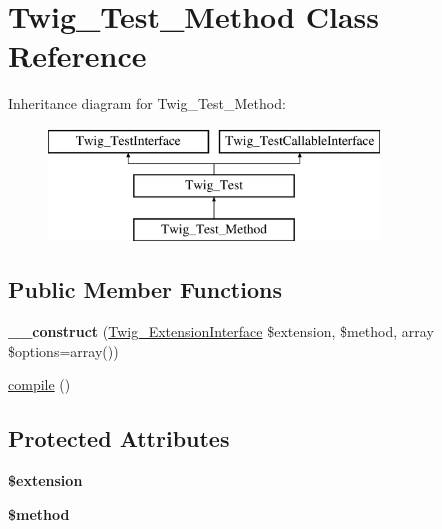 \hypertarget{class_twig___test___method}{}\section{Twig\+\_\+\+Test\+\_\+\+Method Class Reference}
\label{class_twig___test___method}
Inheritance diagram for Twig\+\_\+\+Test\+\_\+\+Method\+:\begin{figure}[H]
\begin{center}
\leavevmode
\includegraphics[height=3.000000cm]{class_twig___test___method}
\end{center}
\end{figure}
\subsection*{Public Member Functions}
\begin{DoxyCompactItemize}
\item 
\hypertarget{class_twig___test___method_a7d07ee619832b0ff21eaf3c7c0159c3f}{}{\bfseries \+\_\+\+\_\+construct} (\hyperlink{interface_twig___extension_interface}{Twig\+\_\+\+Extension\+Interface} \$extension, \$method, array \$options=array())\label{class_twig___test___method_a7d07ee619832b0ff21eaf3c7c0159c3f}

\item 
\hyperlink{class_twig___test___method_a3815e7c2e73f00c2ebffcf5b90eef3b1}{compile} ()
\end{DoxyCompactItemize}
\subsection*{Protected Attributes}
\begin{DoxyCompactItemize}
\item 
\hypertarget{class_twig___test___method_aed02cd2cd0ee08bd99a2ac1ef4f955ce}{}{\bfseries \$extension}\label{class_twig___test___method_aed02cd2cd0ee08bd99a2ac1ef4f955ce}

\item 
\hypertarget{class_twig___test___method_a12661b2fc0f57f97e30a1620889ce9c6}{}{\bfseries \$method}\label{class_twig___test___method_a12661b2fc0f57f97e30a1620889ce9c6}

\end{DoxyCompactItemize}


